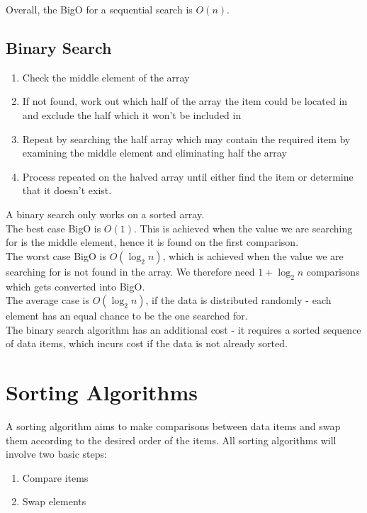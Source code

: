 Overall, the BigO for a sequential search is $O(n)$.

\subsection{Binary Search}
\begin{enumerate}
    \item Check the middle element of the array
    \item If not found, work out which half of the array the item could be located in and exclude the half which it won't be included in
    \item Repeat by searching the half array which may contain the required item by examining the middle element and eliminating half the array
    \item Process repeated on the halved array until either find the item or determine that it doesn't exist.
\end{enumerate}

A binary search only works on a sorted array.\\

The best case BigO is $O(1)$. This is achieved when the value we are searching for is the middle element, hence it is found on the first comparison.\\

The worst case BigO is $O(\log_2n)$, which is achieved when the value we are searching for is not found in the array. We therefore need $1+\log_2n$ comparisons which gets converted into BigO.\\

The average case is $O(\log_2n)$, if the data is distributed randomly - each element has an equal chance to be the one searched for. \\

The binary search algorithm has an additional cost - it requires a sorted sequence of data items, which incurs cost if the data is not already sorted.

\section{Sorting Algorithms}
A sorting algorithm aims to make comparisons between data items and swap them according to the desired order of the items. All sorting algorithms will involve two basic steps:
\begin{enumerate}
    \item Compare items
    \item Swap elements
\end{enumerate}

